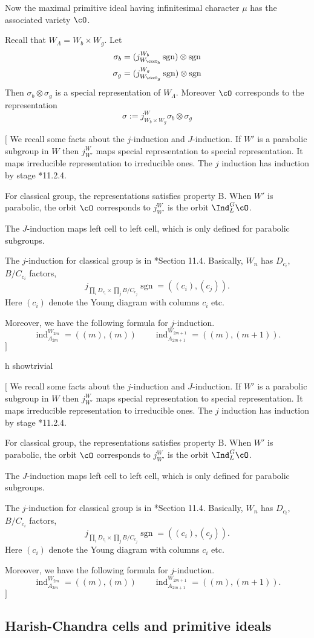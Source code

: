 \documentclass[12pt,a4paper]{amsart}
\newcommand{\trivial}[2][]{\if\relax\detokenize{#1}\relax
  {%
      \color{orange} \vspace{0em} $[$  #2 $]$
      \color{black}
  }
  \else
\ifx#1h
\ifcsname showtrivial\endcsname
{%
    \color{orange} \vspace{0em}  $[$ #2 $]$
    \color{black}
}
\fi
\else {\red Wrong argument!} \fi
\fi
}
\DeclareMathOperator{\ind}{ind}
\newcommand{\sgn}{\operatorname{sgn}}
\numberwithin{equation}{section}
\theoremstyle{remark}
\def\WLam{W_{\Lambda}}
\begin{document}
Now the maximal primitive ideal having infinitesimal character $\mu$
has the associated variety $\cO$.

\def\Wb{W_{b}}
\def\Wg{W_{g}}
\def\WcOb{W_{\ckcO_b}}
\def\WcOg{W_{\ckcO_g}}

Recall that $\WLam = \Wb\times \Wg$.
Let
\[
\begin{split}
  \sigma_{b} &= (j_{\WcOb}^{\Wb}\sgn)\otimes \sgn\\
  \sigma_{g} &= (j_{\WcOg}^{\Wg}\sgn)\otimes \sgn\\
\end{split}
\]
Then $\sigma_{b}\otimes \sigma_{g}$ is a special representation of $\WLam$.
Moreover $\cO$ corresponds to the representation
\[
 \sigma := j_{\Wb\times \Wg}^{W} \sigma_{b}\otimes \sigma_{g}
\]


\trivial{
  We recall some facts about the $j$-induction and $J$-induction.
  If $W'$ is a parabolic subgroup in $W$ then $j_{W'}^{W}$ maps special
  representation to special representation.
  It maps irreducible representation to irreducible ones.
  The $j$ induction has induction by stage \cite{Carter}*{11.2.4}.

  For classical group, the representations satisfies property B.
  When $W'$ is parabolic, the orbit $\cO$ corresponds to $j_{W'}^{W}$ is the orbit
  $\Ind_{L}^{G} \cO$.

  The $J$-induction maps left cell to left cell, which is only defined for
  parabolic subgroups.


  The $j$-induction for classical group is in \cite{Carter}*{Section 11.4}.
  Basically, $W_{n}$ has $D_{c_{i}}$, $B/C_{c_{i}}$ factors,
  \[
    j_{\prod_{i}D_{c_{i}}\times \prod_{j} B/C_{c_{j}}} \sgn  =
      ((c_{i}), (c_{j})).
  \]
  Here $(c_{i})$ denote the Young diagram with columns $c_{i}$ etc.

  Moreover, we have the following formula for $j$-induction.
  \[
    \ind_{A_{2m}}^{W_{2m}} = ((m),(m)) \qquad
    \ind_{A_{2m+1}}^{W_{2m+1}} = ((m),(m+1)).
  \]
}


\subsection{Harish-Chandra cells and primitive ideals}
\end{document}
